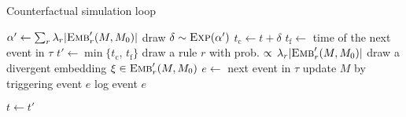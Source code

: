 \begin{algorithm}
\caption{Counterfactual simulation loop}\label{alg:cosimulation}
\begin{spacing}{1.2}
\begin{algorithmic}
  \STATE 
  \STATE \COMMENT { $t$ is the current time, $M$ the current state mixture and
    $M_0$ the intermediate state of $\tau$ at time $t$ }
  \STATE
  \STATE $\alpha' \gets \sum_r {\lambda_r |{\textsc{Emb}}'_{r}(M, M_0)|}$
  \STATE draw $\delta \sim \textsc{Exp}(\alpha') $
  \STATE $t_{\text{c}} \gets t + \delta$
  \STATE $t_{\text{f}} \gets $ time of the next event in $\tau$
  \STATE $t' \gets \min \{ t_{\text{c}}, \, t_{\text{f}} \}$
      \STATE draw a rule $r$ with prob.
      $\propto \, \lambda_r |{\textsc{Emb}}'_{r}(M, M_0)|$
      \STATE  draw a divergent embedding $\xi \in {\textsc{Emb}}'_{r}(M, M_0)$
  \ELSE
      \STATE $e \gets $ next event in $\tau$
  \ENDIF
      \STATE update $M$ by triggering event $e$
      \STATE log event $e$
  \ENDIF

  \STATE $t \gets t'$
  \STATE
\end{algorithmic}
\end{spacing}
\end{algorithm}
